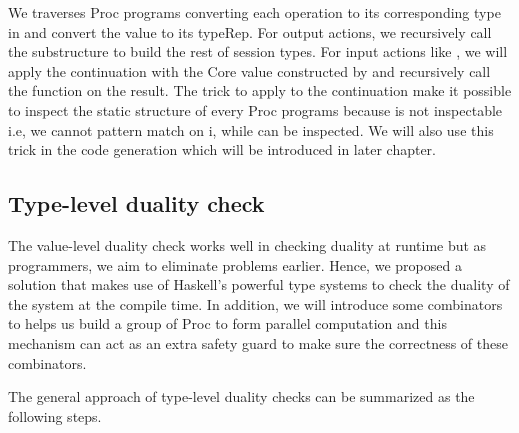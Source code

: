 We traverses Proc programs converting each operation to its corresponding type in  and convert the value to its typeRep. For output actions, we recursively call the substructure to build the rest of session types. For input actions like , we will apply the continuation with the Core value constructed by and recursively call the function on the result. The trick to apply  to the continuation make it possible to inspect the static structure of every Proc programs because  is not inspectable i.e, we cannot pattern match on i, while  can be inspected. We will also use this trick in the code generation which will be introduced in later chapter.
\subsection{Type-level duality check}
The value-level duality check works well in checking duality at runtime but as programmers, we aim to eliminate problems earlier. Hence, we proposed a solution that makes use of Haskell's powerful type systems to check the duality of the system at the compile time. In addition, we will introduce some combinators to helps us build a group of Proc to form parallel computation and this mechanism can act as an extra safety guard to make sure the correctness of these combinators.

The general approach of type-level duality checks can be summarized as the following steps.

